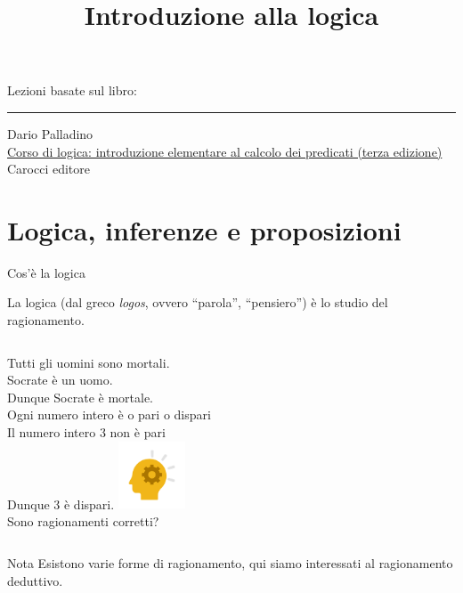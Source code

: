\documentclass[10pt,dvipsnames,handout]{beamer}
\title{Introduzione alla logica}
\begin{document}
\begin{frame}
	\titlepage
\end{frame}

\begin{frame}{}
	Lezioni basate sul libro:

	\smallskip
	\hrule

	\medskip
	Dario Palladino\\
	\href{https://www.carocci.it/prodotto/corso-di-logica-3}{Corso di logica: introduzione elementare al calcolo dei predicati (terza edizione)}\\
	Carocci editore\\

	\bigskip
	\centering
\end{frame}



\section{Logica, inferenze e proposizioni}

\begin{frame}{Cos'è la logica}
	\begin{definition}[Logica]
		La \alert{logica} (dal greco \textit{logos}, ovvero ``parola'', ``pensiero'') è lo studio del ragionamento.
	\end{definition}
	\begin{example}
		\begin{columns}
			\centering

			Tutti gli uomini sono mortali.\\
			Socrate è un uomo.\\
			Dunque Socrate è mortale.\\[0.6cm]
			Ogni numero intero è o pari o dispari\\
			Il numero intero 3 non è pari\\
			Dunque 3 è dispari.
			\centering
			\includegraphics[width=2cm,keepaspectratio]{logica.png}\\
			\alert{Sono ragionamenti corretti?}
		\end{columns}
	\end{example}
	\begin{block}{Nota}
		Esistono varie forme di ragionamento, qui siamo interessati al \alert{ragionamento deduttivo}.
	\end{block}
\end{frame}
\end{document}
